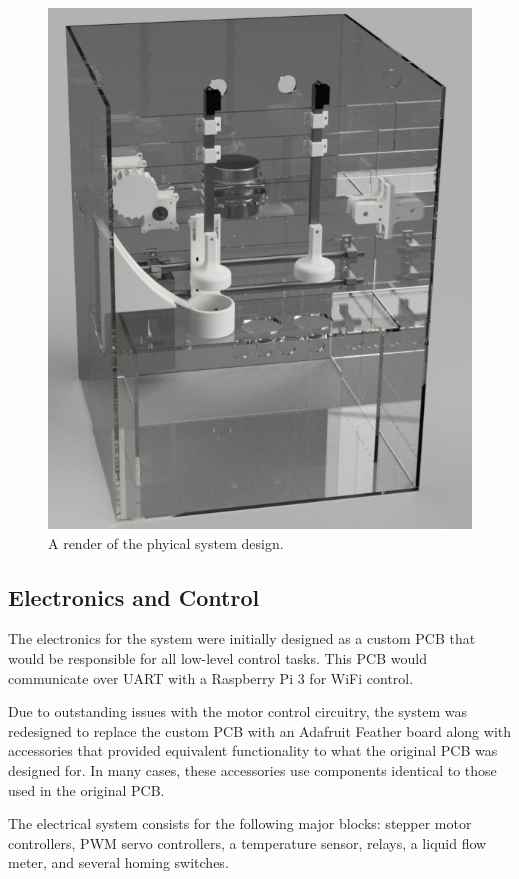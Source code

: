 \documentclass[conference]{IEEEtran}
\begin{document}
\begin{figure}
  \centering
    \includegraphics[width=1.8\columnwidth]{render}
    \caption{A render of the phyical system design.}
\end{figure}

\subsection{Electronics and Control}
The electronics for the system were initially designed as
a custom PCB that would be responsible for all low-level
control tasks. This PCB would communicate over UART with
a Raspberry Pi 3 for WiFi control.

Due to outstanding issues with the motor control circuitry,
the system was redesigned to replace the custom PCB with an
Adafruit Feather board along with accessories that provided
equivalent functionality to what the original PCB was designed
for. In many cases, these accessories use components identical
to those used in the original PCB.

The electrical system consists for the following major
blocks: stepper motor controllers, PWM servo controllers, a
temperature sensor, relays, a liquid flow meter, and several
homing switches.
\end{document}
